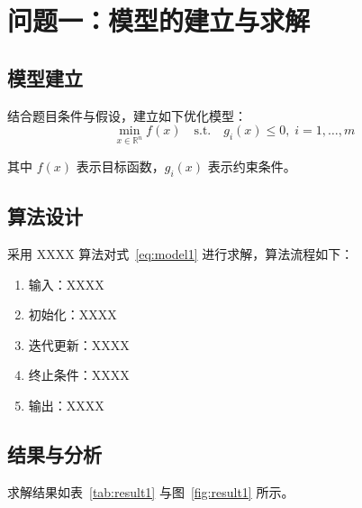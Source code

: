 \section{问题一：模型的建立与求解}

\subsection{模型建立}
结合题目条件与假设，建立如下优化模型：
\begin{equation}
    \min_{x \in \mathbb{R}^n} f(x)
    \quad \text{s.t.} \quad
    g_i(x) \le 0,\; i = 1, \dots, m
    \label{eq:model1}
\end{equation}

其中 $f(x)$ 表示目标函数，$g_i(x)$ 表示约束条件。

\subsection{算法设计}
采用 XXXX 算法对式~\eqref{eq:model1} 进行求解，算法流程如下：
\begin{enumerate}
    \item 输入：XXXX
    \item 初始化：XXXX
    \item 迭代更新：XXXX
    \item 终止条件：XXXX
    \item 输出：XXXX
\end{enumerate}

\subsection{结果与分析}
求解结果如表~\ref{tab:result1} 与图~\ref{fig:result1} 所示。


